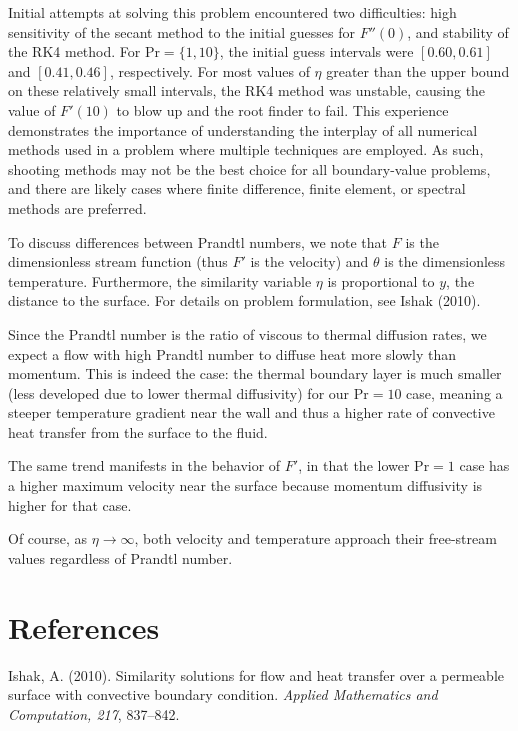 \documentclass[12pt]{article}
\begin{document}
Initial attempts at solving this problem encountered two difficulties: high sensitivity of the secant method to the initial guesses for $F''(0)$, and stability of the RK4 method. For $\text{Pr} = \{1, 10\}$, the initial guess intervals were $[0.60, 0.61]$ and $[0.41, 0.46]$, respectively. For most values of $\eta$ greater than the upper bound on these relatively small intervals, the RK4 method was unstable, causing the value of $F'(10)$ to blow up and the root finder to fail. This experience demonstrates the importance of understanding the interplay of all numerical methods used in a problem where multiple techniques are employed. As such, shooting methods may not be the best choice for all boundary-value problems, and there are likely cases where finite difference, finite element, or spectral methods are preferred.

To discuss differences between Prandtl numbers, we note that $F$ is the dimensionless stream function (thus $F'$ is the velocity) and $\theta$ is the dimensionless temperature. Furthermore, the similarity variable $\eta$ is proportional to $y$, the distance to the surface. For details on problem formulation, see Ishak (2010).

Since the Prandtl number is the ratio of viscous to thermal diffusion rates, we expect a flow with high Prandtl number to diffuse heat more slowly than momentum. This is indeed the case: the thermal boundary layer is much smaller (less developed due to lower thermal diffusivity) for our $\text{Pr} = 10$ case, meaning a steeper temperature gradient near the wall and thus a higher rate of convective heat transfer from the surface to the fluid.

The same trend manifests in the behavior of $F'$, in that the lower $\text{Pr} = 1$ case has a higher maximum velocity near the surface because momentum diffusivity is higher for that case.

Of course, as $\eta \rightarrow \infty$, both velocity and temperature approach their free-stream values regardless of Prandtl number.

\section{References} %

Ishak, A. (2010). Similarity solutions for flow and heat transfer over a permeable surface with convective boundary condition. \textit{Applied Mathematics and Computation, 217}, 837--842.
\end{document}

